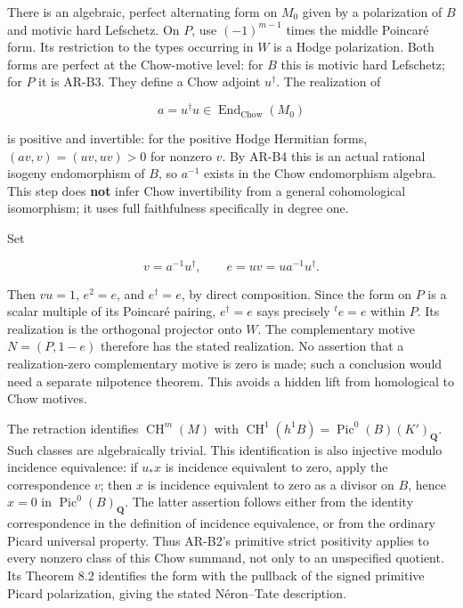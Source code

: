 There is an algebraic, perfect alternating form on \(M_0\) given by a
polarization of \(B\) and motivic hard Lefschetz. On \(P\), use
\((-1)^{m-1}\) times the middle Poincaré form. Its restriction to the
types occurring in \(W\) is a Hodge polarization. Both forms are perfect
at the Chow-motive level: for \(B\) this is motivic hard Lefschetz; for
\(P\) it is AR-B3. They define a Chow adjoint \(u^\dagger\). The
realization of

\[
a=u^\dagger u\in\operatorname{End}_{\mathrm{Chow}}(M_0)
\]

is positive and invertible: for the positive Hodge Hermitian forms,
\((av,v)=(uv,uv)>0\) for nonzero \(v\). By AR-B4 this is an actual
rational isogeny endomorphism of \(B\), so \(a^{-1}\) exists in the Chow
endomorphism algebra. This step does \textbf{not} infer Chow
invertibility from a general cohomological isomorphism; it uses full
faithfulness specifically in degree one.

Set

\[
v=a^{-1}u^\dagger,\qquad e=uv=u a^{-1}u^\dagger.
\]

Then \(vu=1\), \(e^2=e\), and \(e^\dagger=e\), by direct composition.
Since the form on \(P\) is a scalar multiple of its Poincaré pairing,
\(e^\dagger=e\) says precisely \({}^t e=e\) within \(P\). Its
realization is the orthogonal projector onto \(W\). The complementary
motive \(N=(P,1-e)\) therefore has the stated realization. No assertion
that a realization-zero complementary motive is zero is made; such a
conclusion would need a separate nilpotence theorem. This avoids a
hidden lift from homological to Chow motives.

The retraction identifies \(\operatorname{CH}^m(M)\) with
\(\operatorname{CH}^1(h^1B)=\operatorname{Pic}^0(B)(K')_{\mathbf Q}\).
Such classes are algebraically trivial. This identification is also
injective modulo incidence equivalence: if \(u_*x\) is incidence
equivalent to zero, apply the correspondence \(v\); then \(x\) is
incidence equivalent to zero as a divisor on \(B\), hence \(x=0\) in
\(\operatorname{Pic}^0(B)_{\mathbf Q}\). The latter assertion follows
either from the identity correspondence in the definition of incidence
equivalence, or from the ordinary Picard universal property. Thus
AR-B2's primitive strict positivity applies to every nonzero class of
this Chow summand, not only to an unspecified quotient. Its Theorem 8.2
identifies the form with the pullback of the signed primitive Picard
polarization, giving the stated Néron--Tate description.

